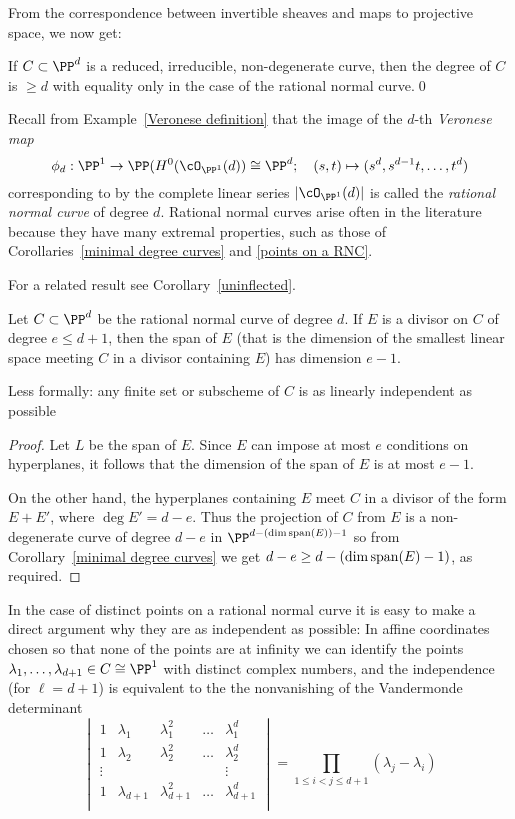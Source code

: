 From the correspondence between invertible sheaves and maps to projective space, we now get:
\begin{corollary}\label{minimal degree curves}
If $C\subset \PP^d$ is a reduced, irreducible, non-degenerate curve, then the degree of $C$ is $\geq d$ with equality only in the case
of the rational normal curve.\qed
\end{corollary}

Recall from Example~\ref{Veronese definition} that the image of the $d$-th \emph{Veronese map}  
$$
\phi_d: \PP^1 \to \PP(H^0(\cO_{\PP^1}(d)) \cong \PP^d; \quad (s,t) \mapsto (s^d, s^{d-1}t, \dots, t^d)
$$
corresponding to by the complete linear series $|\cO_{\PP^1}(d)|$ is called the \emph{rational normal curve} of degree $d$. Rational normal curves arise often in the literature because they have many extremal properties, such as those of Corollaries~\ref{minimal degree curves} and \ref{points on a RNC}.

For a related result see Corollary~\ref{uninflected}.

\begin{corollary}\label{independence of points on a RNC}
Let $C\subset \PP^d$ be the rational normal curve of degree $d$. If $E$ is a divisor on $C$ of degree $e\leq d+1$, then the
span of $E$ (that is the dimension of the smallest linear space meeting $C$ in a divisor containing $E$) has dimension $e-1$.
\end{corollary}
Less formally: any finite set or subscheme of $C$ is as linearly independent as possible

\begin{proof}
Let $L$ be the span of $E$. Since $E$ can impose at most $e$ conditions on hyperplanes, it follows that the dimension of the span of $E$ is
at most $e-1$.

On the other hand, the hyperplanes containing $E$ meet $C$ in a divisor of the form $E+E'$, where
$\deg E' = d-e$. Thus the projection of $C$ from $E$ is a non-degenerate curve of degree $d-e$ in $\PP^{d-(\dim {\rm span}(E))-1}$
so from Corollary~\ref{minimal degree curves} we get $d-e \geq d-(\dim {\rm span}(E)-1)$, as required.
\end{proof}

In the case of distinct points on a rational normal curve
it is easy to make a direct argument why they are as independent as possible: In affine coordinates chosen so that none of the points are
at infinity we can identify the points $\lambda_1,\dots,\lambda_{d+1} \in C \cong \PP^1$ with distinct complex numbers, and the independence (for $\ell = d+1$) is equivalent to the the nonvanishing of the Vandermonde determinant
$$
\begin{vmatrix}
1 & \lambda_1 & \lambda_1^2 & \dots & \lambda_1^d \\
1 & \lambda_2 & \lambda_2^2 & \dots & \lambda_2^d \\
\vdots & & & & \vdots \\
1 & \lambda_{d+1} & \lambda_{d+1}^2 & \dots & \lambda_{d+1}^d \\
\end{vmatrix}
= \prod_{1 \leq i < j \leq d+1} (\lambda_j - \lambda_i)
$$


